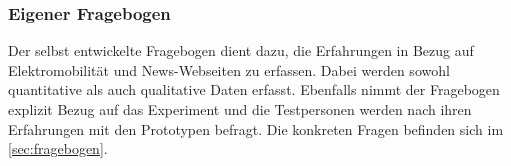 \subsubsection{Eigener Fragebogen}
Der selbst entwickelte Fragebogen dient dazu, die Erfahrungen in Bezug auf Elektromobilität und News-Webseiten zu erfassen.
Dabei werden sowohl quantitative als auch qualitative Daten erfasst.
Ebenfalls nimmt der Fragebogen explizit Bezug auf das Experiment und die Testpersonen werden nach ihren Erfahrungen mit den Prototypen befragt.
Die konkreten Fragen befinden sich im \autoref{sec:fragebogen}.
